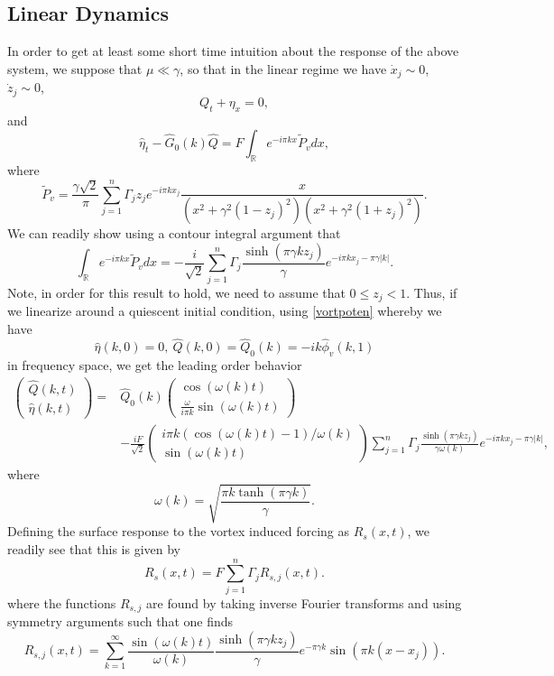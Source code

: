 \documentclass[a4paper,11pt]{article}
\newcommand{\bp}{\begin{pmatrix}}
\newcommand{\ep}{\end{pmatrix}}
\begin{document}
\subsection{Linear Dynamics}
In order to get at least some short time intuition about the response of the above system, we suppose that $\mu \ll \gamma$, so that in the linear regime we have $\dot{x}_{j}\sim 0$, $\dot{z}_{j}\sim 0$, 
\[
Q_{t} + \eta_{x} = 0,
\]
and
\[
\hat{\eta}_{t} -\hat{G}_{0}(k)\hat{Q} = F\int_{\mathbb{R}}e^{-i \pi kx} \tilde{P}_{v}dx,
\]
where
\[
\tilde{P}_{v} = \frac{\gamma\sqrt{2}}{\pi}\sum_{j=1}^{n}\Gamma_{j}z_{j}e^{-i\pi kx_{j}} \frac{x}{(x^{2}+\gamma^{2}(1-z_{j})^{2})(x^{2}+\gamma^{2}(1+z_{j})^{2})} .
\]
We can readily show using a contour integral argument that 
\[
\int_{\mathbb{R}}e^{-i\pi kx} \tilde{P}_{v}dx = -\frac{i}{\sqrt{2}}\sum_{j=1}^{n}\Gamma_{j} \frac{\sinh(\pi \gamma k z_{j})}{\gamma} e^{-i\pi kx_{j}-\pi \gamma |k|}. 
\]
Note, in order for this result to hold, we need to assume that $0\leq z_{j} <1$.  Thus, if we linearize around a quiescent initial condition, using \eqref{vortpoten} whereby we have
\[
\hat{\eta}(k,0)=0, ~ \hat{Q}(k,0)=\hat{Q}_{0}(k) = -ik\hat{\phi}_{v}(k,1)
\]
in frequency space, we get the leading order behavior
\begin{align*}
\bp \hat{Q}(k,t) \\ \hat{\eta}(k,t) \ep = & \hat{Q}_{0}(k)\bp \cos(\omega(k)t)\\\frac{ \omega}{i\pi k} \sin(\omega(k)t)\ep \\
&-\frac{iF}{\sqrt{2}}\bp i\pi k(\cos(\omega(k)t)-1)/\omega(k) \\   \sin(\omega(k)t) \ep \sum_{j=1}^{n}\Gamma_{j}\frac{\sinh(\pi \gamma k z_{j})}{\gamma \omega(k)}e^{-i\pi kx_{j}-\pi \gamma |k|},
\end{align*}
where 
\[
\omega(k) = \sqrt{\frac{ \pi k \tanh(\pi \gamma k)}{ \gamma }}.  
\]
Defining the surface response to the vortex induced forcing as $R_{s}(x,t)$, we readily see that this is given by 
\[
R_{s}(x,t) = F\sum_{j=1}^{n}\Gamma_{j}R_{s,j}(x,t).
\]
where the functions $R_{s,j}$ are found by taking inverse Fourier transforms and using symmetry arguments such that one finds  
\begin{equation}
R_{s,j}(x,t) = \sum_{k=1}^{\infty} \frac{\sin(\omega(k)t)}{\omega(k)}\frac{\sinh(\pi \gamma k z_{j})}{\gamma}e^{-\pi \gamma k}\sin(\pi k (x-x_{j})).
\label{surfresp}
\end{equation}

\end{document}
